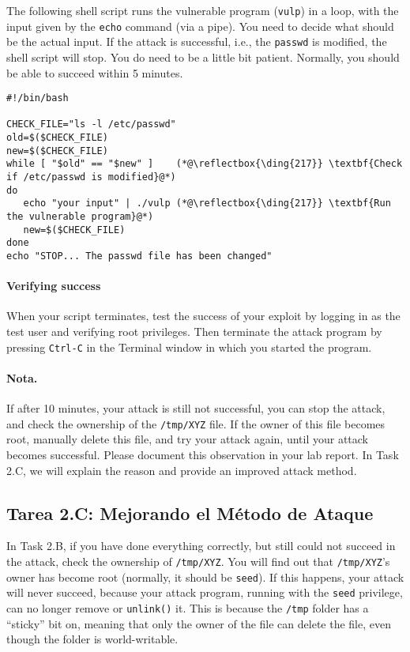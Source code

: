 The following shell script runs the vulnerable program (\texttt{vulp}) in a loop,
with the input given by the \texttt{echo} command (via a pipe).  
You need to decide what should be the actual input. 
If the attack is successful, i.e.,
the \texttt{passwd} is modified, the shell script will stop. 
You do need to be a little bit patient. 
Normally, you should be able to succeed within 5 minutes. 

\begin{lstlisting}
#!/bin/bash

CHECK_FILE="ls -l /etc/passwd"
old=$($CHECK_FILE)
new=$($CHECK_FILE)
while [ "$old" == "$new" ]    (*@\reflectbox{\ding{217}} \textbf{Check if /etc/passwd is modified}@*)
do
   echo "your input" | ./vulp (*@\reflectbox{\ding{217}} \textbf{Run the vulnerable program}@*)
   new=$($CHECK_FILE)
done
echo "STOP... The passwd file has been changed"
\end{lstlisting}

\paragraph{Verifying success}
When your script terminates,
test the success of your exploit by logging in as the test user and
verifying root privileges.  Then terminate the attack program by 
pressing \texttt{Ctrl-C} in the Terminal window in which you started the program.


\paragraph{Nota.}
If after 10 minutes, your attack is still not 
successful, you can stop the attack, and check the ownership
of the \texttt{/tmp/XYZ} file. If the owner of this file
becomes root, manually delete this file, and try your 
attack again, until your attack becomes successful. 
Please document this observation in your lab report. 
In Task 2.C, we will explain the reason and provide
an improved attack method. 



\subsection{Tarea 2.C: Mejorando el Método de Ataque}

In Task 2.B, if you have done everything correctly, but still could not succeed
in the attack, check the ownership of \texttt{/tmp/XYZ}. You will find out    
that \texttt{/tmp/XYZ}'s owner has become root (normally, it should be \texttt{seed}). 
If this happens, your attack will never succeed, because your attack
program, running with the \texttt{seed} privilege, can no longer remove or
\texttt{unlink()} it.  
This is because the \texttt{/tmp}
folder has a ``sticky'' bit on, meaning that only the owner of the file can
delete the file, even though the folder is world-writable. 


